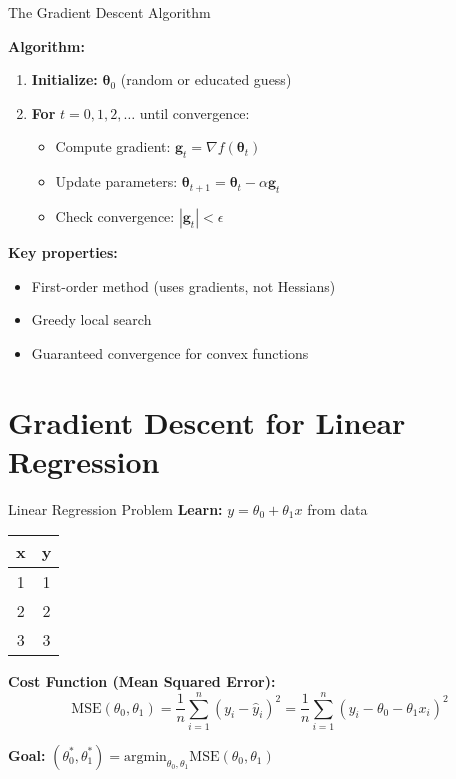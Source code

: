 \documentclass[aspectratio=169,11pt]{beamer}
\newcommand{\grad}{\nabla}
\newcommand{\vtheta}{\bm{\theta}}
\newcommand{\vg}{\bm{g}}
\newcommand{\MSE}{\text{MSE}}
\newcommand{\argmin}{\text{argmin}}
\begin{document}
\begin{frame}{The Gradient Descent Algorithm}
\begin{center}
\alert{\boxed{\vtheta_{t+1} = \vtheta_t - \alpha \grad f(\vtheta_t)}}
\end{center}

\pause
\textbf{Algorithm:}
\begin{enumerate}
\item \textbf{Initialize:} $\vtheta_0$ (random or educated guess)
\item \textbf{For} $t = 0, 1, 2, \ldots$ until convergence:
\begin{itemize}
\item Compute gradient: $\vg_t = \grad f(\vtheta_t)$
\item Update parameters: $\vtheta_{t+1} = \vtheta_t - \alpha \vg_t$
\item Check convergence: $|\vg_t| < \epsilon$
\end{itemize}
\end{enumerate}

\pause
\textbf{Key properties:}
\begin{itemize}
\item First-order method (uses gradients, not Hessians)
\item Greedy local search
\item Guaranteed convergence for convex functions
\end{itemize}
\end{frame}

\section{Gradient Descent for Linear Regression}

\begin{frame}{Linear Regression Problem}
\textbf{Learn:} $y = \theta_0 + \theta_1 x$ from data

\begin{center}
\begin{tabular}{|c|c|}
\hline
\textbf{x} & \textbf{y} \\
\hline
1 & 1 \\
2 & 2 \\
3 & 3 \\
\hline
\end{tabular}
\end{center}

\pause
\textbf{Cost Function (Mean Squared Error):}
\[\MSE(\theta_0, \theta_1) = \frac{1}{n}\sum_{i=1}^n (y_i - \hat{y}_i)^2 = \frac{1}{n}\sum_{i=1}^n (y_i - \theta_0 - \theta_1 x_i)^2\]

\pause
\textbf{Goal:} $(\theta_0^*, \theta_1^*) = \argmin_{\theta_0, \theta_1} \MSE(\theta_0, \theta_1)$
\end{frame}
\end{document}

